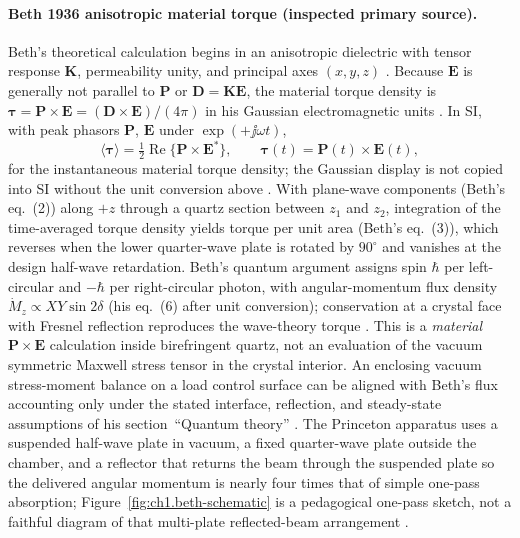 \paragraph{Beth 1936 anisotropic material torque (inspected primary source).}
Beth's theoretical calculation begins in an anisotropic dielectric with tensor response $\mathbf K$, permeability unity, and principal axes $(x,y,z)$ \cite{beth1936}. Because $\mathbf E$ is generally not parallel to $\mathbf P$ or $\mathbf D=\mathbf K\mathbf E$, the material torque density is $\boldsymbol\tau=\mathbf P\times\mathbf E=(\mathbf D\times\mathbf E)/(4\pi)$ in his Gaussian electromagnetic units \cite{beth1936}. In SI, with peak phasors $\mathbf P$, $\mathbf E$ under $\exp(+\jj\omega t)$,
\begin{equation}
\label{eq:ch1.beth-torque-cycle-average}
\langle\boldsymbol\tau\rangle=\tfrac12\operatorname{Re}\{\mathbf P\times\mathbf E^*\},
\qquad
\boldsymbol\tau(t)=\mathbf P(t)\times\mathbf E(t),
\end{equation}
for the instantaneous material torque density; the Gaussian display is not copied into SI without the unit conversion above \cite{beth1936,stratton1941}. With plane-wave components (Beth's eq.~(2)) along $+z$ through a quartz section between $z_1$ and $z_2$, integration of the time-averaged torque density yields torque per unit area (Beth's eq.~(3)), which reverses when the lower quarter-wave plate is rotated by $90^\circ$ and vanishes at the design half-wave retardation. Beth's quantum argument assigns spin $\hbar$ per left-circular and $-\hbar$ per right-circular photon, with angular-momentum flux density $\dot M_z\propto XY\sin 2\delta$ (his eq.~(6) after unit conversion); conservation at a crystal face with Fresnel reflection reproduces the wave-theory torque \cite{beth1936}. This is a \emph{material} $\mathbf P\times\mathbf E$ calculation inside birefringent quartz, not an evaluation of the vacuum symmetric Maxwell stress tensor in the crystal interior. An enclosing vacuum stress-moment balance on a load control surface can be aligned with Beth's flux accounting only under the stated interface, reflection, and steady-state assumptions of his section~``Quantum theory'' \cite{beth1936,stratton1941}. The Princeton apparatus uses a suspended half-wave plate in vacuum, a fixed quarter-wave plate outside the chamber, and a reflector that returns the beam through the suspended plate so the delivered angular momentum is nearly four times that of simple one-pass absorption; Figure~\ref{fig:ch1.beth-schematic} is a pedagogical one-pass sketch, not a faithful diagram of that multi-plate reflected-beam arrangement \cite{beth1936}.

